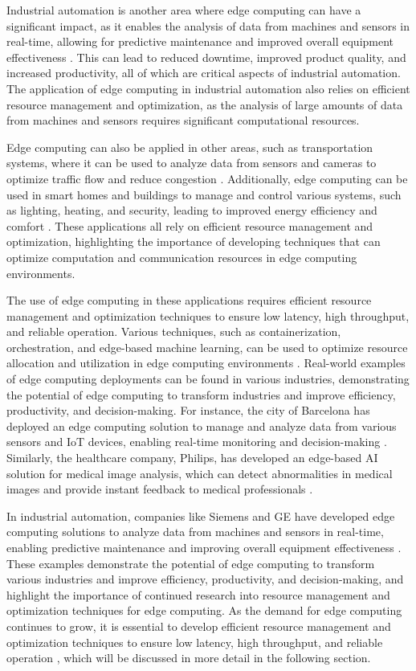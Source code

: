 \documentclass[11pt]{article}
\begin{document}
Industrial automation is another area where edge computing can have a significant impact, as it enables the analysis of data from machines and sensors in real-time, allowing for predictive maintenance and improved overall equipment effectiveness \cite{ref159}. This can lead to reduced downtime, improved product quality, and increased productivity, all of which are critical aspects of industrial automation. The application of edge computing in industrial automation also relies on efficient resource management and optimization, as the analysis of large amounts of data from machines and sensors requires significant computational resources.

Edge computing can also be applied in other areas, such as transportation systems, where it can be used to analyze data from sensors and cameras to optimize traffic flow and reduce congestion \cite{ref160}. Additionally, edge computing can be used in smart homes and buildings to manage and control various systems, such as lighting, heating, and security, leading to improved energy efficiency and comfort \cite{ref161}. These applications all rely on efficient resource management and optimization, highlighting the importance of developing techniques that can optimize computation and communication resources in edge computing environments.

The use of edge computing in these applications requires efficient resource management and optimization techniques to ensure low latency, high throughput, and reliable operation. Various techniques, such as containerization, orchestration, and edge-based machine learning, can be used to optimize resource allocation and utilization in edge computing environments \cite{ref162}. Real-world examples of edge computing deployments can be found in various industries, demonstrating the potential of edge computing to transform industries and improve efficiency, productivity, and decision-making. For instance, the city of Barcelona has deployed an edge computing solution to manage and analyze data from various sensors and IoT devices, enabling real-time monitoring and decision-making \cite{ref3}. Similarly, the healthcare company, Philips, has developed an edge-based AI solution for medical image analysis, which can detect abnormalities in medical images and provide instant feedback to medical professionals \cite{ref158}.

In industrial automation, companies like Siemens and GE have developed edge computing solutions to analyze data from machines and sensors in real-time, enabling predictive maintenance and improving overall equipment effectiveness \cite{ref159}. These examples demonstrate the potential of edge computing to transform various industries and improve efficiency, productivity, and decision-making, and highlight the importance of continued research into resource management and optimization techniques for edge computing. As the demand for edge computing continues to grow, it is essential to develop efficient resource management and optimization techniques to ensure low latency, high throughput, and reliable operation \cite{ref117}, which will be discussed in more detail in the following section.
\end{document}
